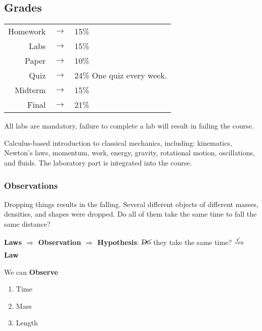 \documentclass[../Notes.tex]{subfiles}
\begin{document}
    \subsection*{Grades}
    \horizontal

    \begin{tabular}{rcl}
        Homework & $\rightarrow$ & 15\% \\
        Labs & $\rightarrow$ & 15\% \\
        Paper & $\rightarrow$ & 10\% \\
        Quiz & $\rightarrow$ & 24\% One quiz every week. \\
        Midterm & $\rightarrow$ & 15\% \\
        Final & $\rightarrow$ & 21\% 
    \end{tabular}

    \horizontal

    All labs are mandatory, failure to complete a lab will result in failing the course.

    Calculus-based introduction to classical mechanics, including: kinematics, Newton's laws, momentum, work, energy, gravity, rotational motion, oscillations, and fluids. The laboratory part is integrated into the course.

    \horizontal

    \subsubsection*{Observations}

    Dropping things results in the falling. Several different objects of different masses, densities, and shapes were dropped. Do all of them take the same time to fall the same distance?

    \textbf{Laws $\Rightarrow$ Observation $\Rightarrow$ Hypothesis}: $\cancel{\text{Do}}$ they take the same time? $\xRightarrow{\checkmark}$ \textbf{Law}

    We can \textbf{Observe}
    \begin{enumerate}
        \item Time
        \item Mass
        \item Length
    \end{enumerate}
\end{document}

